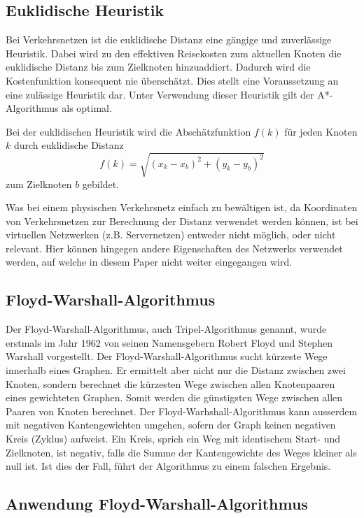 \subsection{Euklidische Heuristik}
\label{sec:verkehr/euklidische}
Bei Verkehrsnetzen ist die euklidische Distanz eine gängige und zuverlässige Heuristik. Dabei wird zu den effektiven Reisekosten zum aktuellen Knoten die euklidische Distanz bis zum Zielknoten hinzuaddiert. Dadurch wird die Kostenfunktion konsequent nie überschätzt. Dies stellt eine Voraussetzung an eine zulässige Heuristik dar. Unter Verwendung dieser Heuristik gilt der A*-Algorithmus als optimal.

Bei der euklidischen Heuristik wird die Abschätzfunktion $f(k)$ für jeden Knoten $k$ durch euklidische Distanz
\begin{equation}
f(k)=\sqrt{(x_k-x_b)^2+(y_k-y_b)^2}
\end{equation}
zum Zielknoten $b$ gebildet.

Was bei einem physischen Verkehrsnetz einfach zu bewältigen ist, da Koordinaten von Verkehrsnetzen zur Berechnung der Distanz verwendet werden können, ist bei virtuellen Netzwerken (z.B. Servernetzen) entweder nicht möglich, oder nicht relevant. Hier können hingegen andere Eigenschaften des Netzwerks verwendet werden, auf welche in diesem Paper nicht weiter eingegangen wird.

\subsection{Floyd-Warshall-Algorithmus}
%
Der Floyd-Warshall-Algorithmus, auch Tripel-Algorithmus genannt, wurde erstmals im Jahr 1962 von seinen Namensgebern Robert Floyd und Stephen Warshall vorgestellt.
Der Floyd-Warshall-Algorithmus sucht kürzeste Wege innerhalb eines Graphen. Er ermittelt aber nicht nur die Distanz zwischen zwei Knoten, sondern berechnet die kürzesten Wege zwischen allen Knotenpaaren eines gewichteten Graphen. Somit werden die günstigsten Wege zwischen allen Paaren von Knoten berechnet. Der Floyd-Warhshall-Algorithmus kann ausserdem mit negativen Kantengewichten umgehen, sofern der Graph keinen negativen Kreis (Zyklus) aufweist. Ein Kreis, sprich ein Weg mit identischem Start- und Zielknoten, ist negativ, falls die Summe der Kantengewichte des Weges kleiner als null ist. Ist dies der Fall, führt der Algorithmus zu einem falschen Ergebnis.
%
%

\subsection{Anwendung Floyd-Warshall-Algorithmus}

